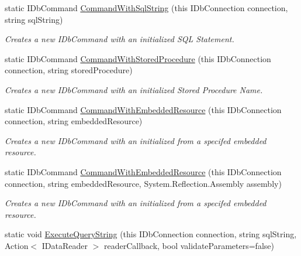 \begin{DoxyCompactItemize}
\item 
static I\+Db\+Command \mbox{\hyperlink{class_blue_cloud_1_1_extensions_1_1_data_1_1_i_db_connection_extensions_ace25288fc9d48650a733cb64b1ba1d51}{Command\+With\+Sql\+String}} (this I\+Db\+Connection connection, string sql\+String)
\begin{DoxyCompactList}\small\item\em Creates a new I\+Db\+Command with an initialized S\+QL Statement. \end{DoxyCompactList}\item 
static I\+Db\+Command \mbox{\hyperlink{class_blue_cloud_1_1_extensions_1_1_data_1_1_i_db_connection_extensions_a3ab3a6435b37ddb3254ed1be83bb74c9}{Command\+With\+Stored\+Procedure}} (this I\+Db\+Connection connection, string stored\+Procedure)
\begin{DoxyCompactList}\small\item\em Creates a new I\+Db\+Command with an initialized Stored Procedure Name. \end{DoxyCompactList}\item 
static I\+Db\+Command \mbox{\hyperlink{class_blue_cloud_1_1_extensions_1_1_data_1_1_i_db_connection_extensions_aa556c672e950d5fcf5930de536a85a46}{Command\+With\+Embedded\+Resource}} (this I\+Db\+Connection connection, string embedded\+Resource)
\begin{DoxyCompactList}\small\item\em Creates a new I\+Db\+Command with an initialized from a specifed embedded resource. \end{DoxyCompactList}\item 
static I\+Db\+Command \mbox{\hyperlink{class_blue_cloud_1_1_extensions_1_1_data_1_1_i_db_connection_extensions_a46009b6907850de6e6d764d5dabd4d4a}{Command\+With\+Embedded\+Resource}} (this I\+Db\+Connection connection, string embedded\+Resource, System.\+Reflection.\+Assembly assembly)
\begin{DoxyCompactList}\small\item\em Creates a new I\+Db\+Command with an initialized from a specifed embedded resource. \end{DoxyCompactList}\item 
static void \mbox{\hyperlink{class_blue_cloud_1_1_extensions_1_1_data_1_1_i_db_connection_extensions_a3b45608e2c25aa1275229f99be2d929b}{Execute\+Query\+String}} (this I\+Db\+Connection connection, string sql\+String, Action$<$ I\+Data\+Reader $>$ reader\+Callback, bool validate\+Parameters=false)

\end{DoxyCompactItemize}
